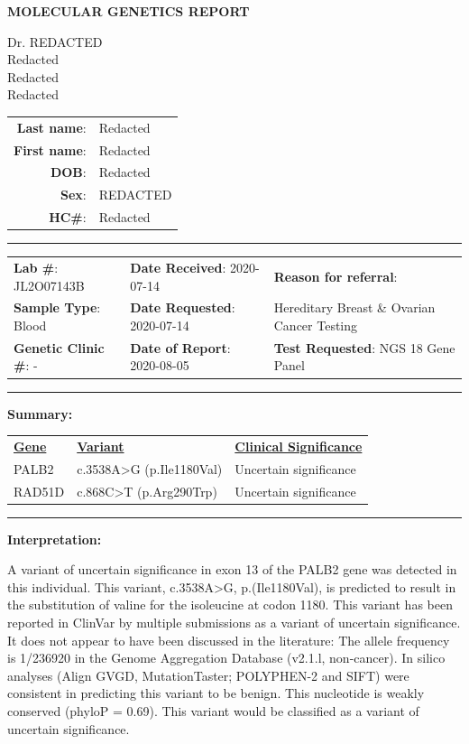 \documentclass[10pt]{article}
\begin{document}
\begin{center}
\large \bf MOLECULAR GENETICS REPORT
\end{center}

\parbox{.45\textwidth}{
Dr. REDACTED \\
Redacted\\
Redacted \\
Redacted
}\hfill
\parbox{.45\textwidth}{
\begin{tabular}{r l}
{\bf Last name}:& Redacted\\
{\bf First name}: & Redacted\\
{\bf DOB}: & Redacted\\
{\bf Sex}: & REDACTED \\
{\bf HC\#}: & Redacted\\
\end{tabular}
}

\rule{\textwidth}{1pt}

\begin{tabular}{l l l}
{\bf Lab \#}: JL2O07143B & {\bf Date Received}: 2020-07-14 & {\bf Reason for referral}:\\
{\bf Sample Type}: Blood & {\bf Date Requested}: 2020-07-14 & Hereditary Breast \& Ovarian Cancer Testing \\
{\bf Genetic Clinic \#}: - & {\bf Date of Report}: 2020-08-05 & {\bf Test Requested}: NGS 18 Gene Panel
\end{tabular}

\rule{\textwidth}{1pt}

{\bf Summary:}

\vspace{-24pt}
\begin{tabular}{>{\centering\arraybackslash}p{5cm} >{\centering\arraybackslash}p{6cm} >{\centering\arraybackslash}p{4cm}}
\underline{\bf Gene} & \underline{\bf Variant} & \underline{\bf Clinical Significance} \\
PALB2 & c.3538A>G (p.Ile1180Val) & Uncertain significance \\
RAD51D & c.868C>T (p.Arg290Trp) & Uncertain significance \\
\end{tabular}
 
\rule{\textwidth}{1pt}

{\bf Interpretation:}

A variant of uncertain significance in exon 13 of the PALB2 gene was detected in this individual. This variant, c.3538A>G, p.(Ile1180Val), is predicted to result in the substitution of valine for the isoleucine at codon 1180. This variant has been reported in ClinVar by multiple submissions as a variant of uncertain significance. It does not appear to have been discussed in the literature: The allele frequency is 1/236920 in the Genome Aggregation Database (v2.1.l, non-cancer). In silico analyses (Align GVGD, MutationTaster; POLYPHEN-2 and SIFT) were consistent in predicting this variant to be benign. This nucleotide is weakly conserved (phyloP = 0.69). This variant would be classified as a variant of uncertain significance. 
\end{document}

